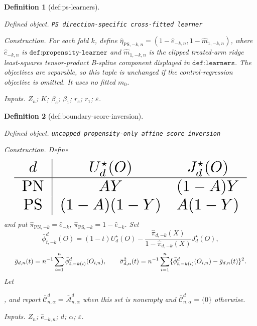\documentclass{article}
\newtheorem{definition}{Definition}
\begin{document}
\begin{definition}[def:ps-learners]\label{def:ps-learners}
\par\smallskip\noindent\emph{Defined object.} \texttt{PS direction-\allowbreak{}specific cross-\allowbreak{}fitted learner}
\par\smallskip\noindent\emph{Construction.} For each fold \(k\), define \(\widehat\eta_{\mathrm{PS},-k,n}=(1-\widehat e_{-k,n},1-\widehat m_{1,-k,n})\), where \(\widehat e_{-k,n}\) is \(\texttt{def:propensity-learner}\) and \(\widehat m_{1,-k,n}\) is the clipped treated-arm ridge least-squares tensor-product B-spline component displayed in \(\texttt{def:learners}\). The objectives are separable, so this tuple is unchanged if the control-regression objective is omitted. It uses no fitted \(m_0\).
\par\smallskip\noindent\emph{Inputs.} \(Z_n\); \(K\); \(\beta_e\); \(\beta_1\); \(r_e\); \(r_1\); \(\varepsilon\).
\end{definition}

\begin{definition}[def:boundary-score-inversion]\label{def:boundary-score-inversion}
\par\smallskip\noindent\emph{Defined object.} \texttt{uncapped propensity-\allowbreak{}only affine score inversion}
\par\smallskip\noindent\emph{Construction.} Define
\[
\makebox[\linewidth][c]{\resizebox{0.98\linewidth}{!}{\par\noindent \makebox[\linewidth][c]{\resizebox{0.98\linewidth}{!}{\(\displaystyle \displaystyle \begin{array}{c|cc}d&U_d^\star(O)&J_d^\star(O)\\ \hline\mathrm{PN}&AY&(1-A)Y\\\mathrm{PS}&(1-A)(1-Y)&A(1-Y)\end{array}\)}}\par\noindent}}
\]
and put \(\widehat\pi_{\mathrm{PN},-k}=\widehat e_{-k}\), \(\widehat\pi_{\mathrm{PS},-k}=1-\widehat e_{-k}\). Set
\[\bar\phi_{t,-k}^d(O)=(1-t)U_d^\star(O)-\frac{\widehat\pi_{d,-k}(X)}{1-\widehat\pi_{d,-k}(X)}J_d^\star(O),\]
\[
\makebox[\linewidth][c]{\resizebox{0.98\linewidth}{!}{\par\noindent \makebox[\linewidth][c]{\resizebox{0.98\linewidth}{!}{\(\displaystyle \displaystyle \bar g_{d,n}(t)=n^{-1}\sum_{i=1}^n\bar\phi_{t,-k(i)}^d(O_{i,n}),\qquad \bar\sigma_{d,n}^2(t)=n^{-1}\sum_{i=1}^n\{\bar\phi_{t,-k(i)}^d(O_{i,n})-\bar g_{d,n}(t)\}^2.\)}}\par\noindent}}
\]
Let \par\noindent {}\par\noindent, and report \(\bar{\mathcal C}_{n,\alpha}^d=\bar{\mathcal A}_{n,\alpha}^d\) when this set is nonempty and \(\bar{\mathcal C}_{n,\alpha}^d=\{0\}\) otherwise.
\par\smallskip\noindent\emph{Inputs.} \(Z_n\); \(\widehat e_{-k,n}\); \(d\); \(\alpha\); \(\varepsilon\).
\end{definition}
\end{document}
